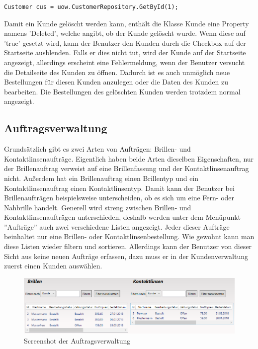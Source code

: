 \begin{lstlisting}
Customer cus = uow.CustomerRepository.GetById(1);
\end{lstlisting}
Damit ein Kunde gelöscht werden kann, enthält die Klasse Kunde eine Property namens 'Deleted', welche angibt, ob der Kunde gelöscht wurde. Wenn diese auf 'true' gesetzt wird, kann der Benutzer den Kunden durch die Checkbox auf der Startseite ausblenden. Falls er dies nicht tut, wird der Kunde auf der Startseite angezeigt, allerdings erscheint eine Fehlermeldung, wenn der Benutzer versucht die Detailseite des Kunden zu öffnen. Dadurch ist es auch unmöglich neue Bestellungen für diesen Kunden anzulegen oder die Daten des Kunden zu bearbeiten. Die Bestellungen des gelöschten Kunden werden trotzdem normal angezeigt.
\subsection{Auftragsverwaltung}
Grundsätzlich gibt es zwei Arten von Aufträgen: Brillen- und Kontaktlinsenaufträge. Eigentlich haben beide Arten dieselben Eigenschaften, nur der Brillenauftrag verweist auf eine Brillenfassung und der Kontaktlinsenauftrag nicht. Außerdem hat ein Brillenauftrag einen Brillentyp und ein Kontaktlinsenauftrag einen Kontaktlinsentyp. Damit kann der Benutzer bei Brillenaufträgen beispielsweise unterscheiden, ob es sich um eine Fern- oder Nahbrille handelt. Generell wird streng zwischen Brillen- und Kontaktlinsenaufträgen unterschieden, deshalb werden unter dem Menüpunkt ''Aufträge'' auch zwei verschiedene Listen angezeigt. Jeder dieser Aufträge beinhaltet nur eine Brillen- oder Kontaktlinsenbestellung. Wie gewohnt kann man diese Listen wieder filtern und sortieren. Allerdings kann der Benutzer von dieser Sicht aus keine neuen Aufträge erfassen, dazu muss er in der Kundenverwaltung zuerst einen Kunden auswählen. 
\begin{figure}[H]
\begin{center}
	\includegraphics[scale=.45]{images/Auftraege.png}
\end{center}
	\caption{Screenshot der Auftragsverwaltung}
	\label{fig:sample}
\end{figure}

